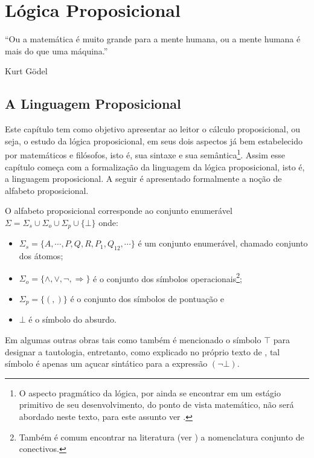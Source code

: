 \chapter{Lógica Proposicional}\label{cap:LogicsPropositional}

\epigraph{``Ou a matemática é muito grande para a mente humana, ou a mente humana é mais do que uma máquina.''}{Kurt Gödel}

\section{A Linguagem Proposicional}\label{A Linguagem proposicional}

Este capítulo tem como objetivo apresentar ao leitor o cálculo proposicional, ou seja, o estudo da lógica proposicional, em seus dois aspectos já bem estabelecido por matemáticos e filósofos, isto é,  sua sintaxe e sua semântica\footnote{O aspecto pragmático da lógica, por ainda se encontrar em um estágio primitivo de seu desenvolvimento, do ponto de vista matemático, não será abordado neste texto, para este assunto ver \cite{rodrigues2021, silva2018}.}. Assim esse capítulo começa com a formalização da linguagem da lógica proposicional, isto é, a linguagem proposicional. A seguir é apresentado formalmente a noção de alfabeto proposicional.

\begin{definicao}\label{def:AlfabetoProposicional}
  O alfabeto proposicional corresponde ao conjunto enumerável $\Sigma = \Sigma_s \cup \Sigma_o \cup \Sigma_p \cup \{\bot\}$ onde:
  \begin{itemize}
      \item $\Sigma_s = \{A, \cdots, P, Q, R, P_1, Q_{12}, \cdots\}$ é um conjunto enumerável, chamado conjunto dos átomos;
      \item $\Sigma_o = \{\land, \lor, \neg, \Rightarrow\}$ é o conjunto dos símbolos operacionais\footnote{Também é comum encontrar na literatura (ver \cite{joaoPavao2014}) a nomenclatura conjunto de conectivos.};
      \item $\Sigma_p = \{(, )\}$ é o conjunto dos símbolos de pontuação e
      \item $\bot$ é o símbolo do absurdo.
  \end{itemize}
\end{definicao}

Em algumas outras obras tais como \cite{carmo2013} também é mencionado o símbolo $\top$ para designar a tautologia, entretanto, como explicado no próprio texto de \cite{carmo2013}, tal símbolo é apenas um açucar sintático para a expressão $(\neg \bot)$.

